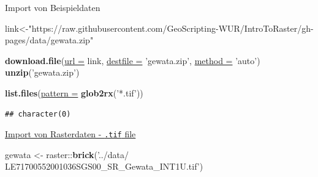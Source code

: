 \documentclass[ignorenonframetext,]{beamer}
\newenvironment{Shaded}{\begin{snugshade}}{\end{snugshade}}
\newcommand{\DataTypeTok}[1]{\textcolor[rgb]{0.74,0.68,0.62}{\underline{#1}}}
\newcommand{\KeywordTok}[1]{\textcolor[rgb]{0.26,0.66,0.93}{\textbf{#1}}}
\newcommand{\NormalTok}[1]{\textcolor[rgb]{0.74,0.68,0.62}{#1}}
\newcommand{\OperatorTok}[1]{\textcolor[rgb]{0.74,0.68,0.62}{#1}}
\newcommand{\StringTok}[1]{\textcolor[rgb]{0.02,0.61,0.04}{#1}}
\begin{document}
\begin{frame}[fragile]{Import von Beispieldaten}
\protect\hypertarget{import-von-beispieldaten}{}

\begin{Shaded}
\begin{Highlighting}[]
\NormalTok{link<-}\StringTok{"https://raw.githubusercontent.com/GeoScripting-WUR/IntroToRaster/gh-pages/data/gewata.zip"}
\end{Highlighting}
\end{Shaded}

\begin{Shaded}
\begin{Highlighting}[]
\KeywordTok{download.file}\NormalTok{(}\DataTypeTok{url =}\NormalTok{ link, }\DataTypeTok{destfile =} \StringTok{'gewata.zip'}\NormalTok{, }\DataTypeTok{method =} \StringTok{'auto'}\NormalTok{)}
\KeywordTok{unzip}\NormalTok{(}\StringTok{'gewata.zip'}\NormalTok{)}
\end{Highlighting}
\end{Shaded}

\begin{Shaded}
\begin{Highlighting}[]
\KeywordTok{list.files}\NormalTok{(}\DataTypeTok{pattern =} \KeywordTok{glob2rx}\NormalTok{(}\StringTok{'*.tif'}\NormalTok{))}
\end{Highlighting}
\end{Shaded}

\begin{verbatim}
## character(0)
\end{verbatim}

\end{frame}

\begin{frame}[fragile]{\href{https://geoscripting-wur.github.io/IntroToRaster/}{Import
von Rasterdaten - \texttt{.tif} file}}
\protect\hypertarget{import-von-rasterdaten---.tif-file}{}

\begin{Shaded}
\begin{Highlighting}[]
\NormalTok{gewata <-}\StringTok{ }\NormalTok{raster}\OperatorTok{::}\KeywordTok{brick}\NormalTok{(}\StringTok{'../data/}
\StringTok{LE71700552001036SGS00_SR_Gewata_INT1U.tif'}\NormalTok{)}
\end{Highlighting}
\end{Shaded}

\end{frame}
\end{document}
